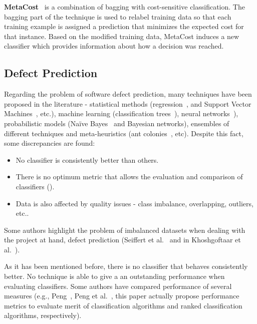 
\textbf{MetaCost}~\cite{Domingos1999} is a combination of bagging with 
cost-sensitive classification. The bagging part of the technique is used to 
relabel training data so that each training example is assigned a prediction 
that minimizes the expected cost for that instance. Based on the modified 
training data, MetaCost induces a new classifier which provides information 
about how a decision was reached.

\subsection{Defect Prediction}\label{subsec:defectPrediction}

Regarding the problem of software defect prediction, many techniques have been 
proposed in the literature - statistical methods (regression~\cite{Bibi2008}, 
and Support Vector Machines~\cite{Elish2008}, etc.), machine learning 
(classification trees~\cite{Khoshgoftaar02}), neural 
networks~\cite{Khoshgoftaar97}), probabilistic models 
(Na\"ive Bayes~\cite{Menzies07b} and Bayesian networks), ensembles of different 
techniques and meta-heuristics (ant colonies~\cite{Vandecruys2008}, etc). 
Despite this fact, some discrepancies are found:

\begin{itemize}
    \item No classifier is consistently better than others.
    \item There is no optimum metric that allows the evaluation and comparison
    of classifiers (\cite{Mende09,Zhang07,Menzies07b}).
    \item Data is also affected by quality issues - class imbalance, 
    overlapping, outliers, etc..
\end{itemize}

Some authors highlight the problem of imbalanced datasets when dealing with
the project at hand, defect prediction (Seiffert et al.~\cite{Seiffert2009} and 
in Khoshgoftaar et al.~\cite{Khoshgoftaar03}).

As it has been mentioned before, there is no classifier that behaves 
consistently better. No technique is able to give a an outstanding performance 
when evaluating classifiers. Some authors have compared performance of several 
measures (e.g., Peng~\cite{Peng2009}, Peng et al.~\cite{Peng2010}, this paper 
actually propose performance metrics to evaluate merit of classification 
algorithms and ranked classification algorithms, respectively).

